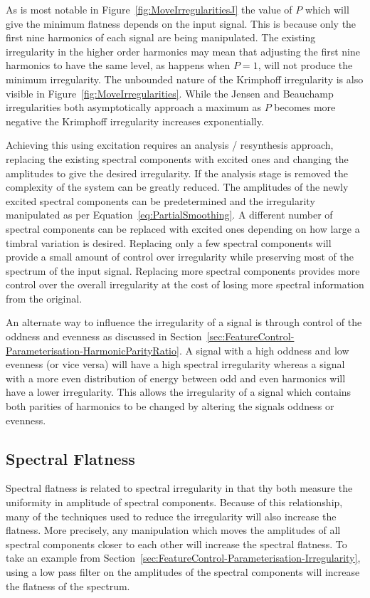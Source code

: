 		As is most notable in Figure~\ref{fig:MoveIrregularitiesJ} the value of $P$ which will give the minimum
		flatness depends on the input signal. This is because only the first nine harmonics of each signal are
		being manipulated. The existing irregularity in the higher order harmonics may mean that adjusting the
		first nine harmonics to have the same level, as happens when $P = 1$, will not produce the minimum
		irregularity. The unbounded nature of the Krimphoff irregularity is also visible in
		Figure~\ref{fig:MoveIrregularities}.  While the Jensen and Beauchamp irregularities both asymptotically
		approach a maximum as $P$ becomes more negative the Krimphoff irregularity increases exponentially.

		Achieving this using excitation requires an analysis / resynthesis approach, replacing the existing
		spectral components with excited ones and changing the amplitudes to give the desired irregularity. If the
		analysis stage is removed the complexity of the system can be greatly reduced. The amplitudes of the newly
		excited spectral components can be predetermined and the irregularity manipulated as per
		Equation~\ref{eq:PartialSmoothing}. A different number of spectral components can be replaced with excited
		ones depending on how large a timbral variation is desired. Replacing only a few spectral components will
		provide a small amount of control over irregularity while preserving most of the spectrum of the input
		signal. Replacing more spectral components provides more control over the overall irregularity at the cost
		of losing more spectral information from the original.

		An alternate way to influence the irregularity of a signal is through control of the oddness and evenness
		as discussed in Section~\ref{sec:FeatureControl-Parameterisation-HarmonicParityRatio}. A signal with a high
		oddness and low evenness (or vice versa) will have a high spectral irregularity whereas a signal with a
		more even distribution of energy between odd and even harmonics will have a lower irregularity. This allows
		the irregularity of a signal which contains both parities of harmonics to be changed by altering the
		signals oddness or evenness.

	\subsection{Spectral Flatness}
	\label{sec:FeatureControl-Parameterisation-Flatness}
		Spectral flatness is related to spectral irregularity in that thy both measure the uniformity in amplitude
		of spectral components. Because of this relationship, many of the techniques used to reduce the
		irregularity will also increase the flatness. More precisely, any manipulation which moves the amplitudes
		of all spectral components closer to each other will increase the spectral flatness. To take an example
		from Section~\ref{sec:FeatureControl-Parameterisation-Irregularity}, using a low pass filter on the
		amplitudes of the spectral components will increase the flatness of the spectrum. 
		
